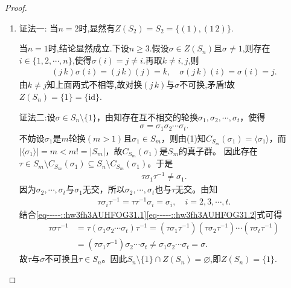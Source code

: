 \documentclass[../../main.tex]{subfiles}%
\begin{document}
\begin{proof}
\begin{enumerate}[(1)]
\begin{align*}
{}.
\end{align*}
从而
\begin{align*}
\tau \left( 1 \right) =i,\tau \left( 2 \right) =i+1,\cdots ,\tau \left( n-i+1 \right) =n,\tau \left( n-i+2 \right) =1,\cdots ,\tau \left( n \right) =i-1.
\end{align*}
于是
\begin{align*}
\tau=\begin{pmatrix}
1 & 2 & \cdots & n-i+1 & n-i+2 & \cdots & n \\
i & i+1 & \cdots & n & 1 & \cdots & i-1
\end{pmatrix},
\end{align*}
即$\tau=\sigma^{i-1}$. 故$C_{S_n}(\sigma)=\langle\sigma\rangle$.

\item {\color{blue}证法一:}
当$n=2$时,显然有$Z(S_2)=S_2=\{(1),(1\,2)\}$.

当$n=1$时,结论显然成立.下设$n\geqslant 3$.假设$\sigma \in Z(S_n)$且$\sigma \neq 1$,则存在$i\in \{1,2,\cdots,n\}$,使得$\sigma(i)=j\neq i$.再取$k\neq i,j$,则
\begin{gather*}
(j\,k)\sigma(i)=(j\,k)(j)=k,
\quad
\sigma(j\,k)(i)=\sigma(i)=j.
\end{gather*}
由$k\neq j$知上面两式不相等,故对换$(j\,k)$与$\sigma$不可换,矛盾!故$Z(S_n)=\{1\}=\{\text{id}\}$.

{\color{blue}证法二:}设$\sigma \in S_n\setminus\{1\}$，由知存在互不相交的轮换$\sigma_1,\sigma_2,\cdots,\sigma_t$，使得
\begin{align*}
\sigma = \sigma_1\sigma_2\cdots\sigma_t.
\end{align*}
不妨设$\sigma_1$是$m$轮换$(m>1)$且$\sigma_1\in S_m$，则由(1)知$C_{S_m}(\sigma_1)=\langle\sigma_1\rangle$，而$|\langle\sigma_1\rangle|=m<m!=|S_m|$，故$C_{S_m}(\sigma_1)$是$S_m$的真子群。
因此存在$\tau \in S_m\setminus C_{S_m}(\sigma_1) \subseteq S_n\setminus C_{S_m}(\sigma_1)$。于是
\begin{align}
\tau \sigma_1 \tau^{-1} \neq \sigma_1. \label{eq-----::hw3fh3AUHFOG31.1}
\end{align}
因为$\sigma_2,\cdots,\sigma_t$与$\sigma_1$无交，所以$\sigma_2,\cdots,\sigma_t$也与$\tau$无交。由知
\begin{align}
\tau \sigma_i \tau^{-1} = \tau \tau^{-1}\sigma_i = \sigma_i,\quad i=2,3,\cdots,t. \label{eq-----::hw3fh3AUHFOG31.2}
\end{align}
结合\eqref{eq-----::hw3fh3AUHFOG31.1}\eqref{eq-----::hw3fh3AUHFOG31.2}式可得
\begin{align*}
\tau \sigma \tau^{-1} &= \tau (\sigma_1\sigma_2\cdots\sigma_t) \tau^{-1} = (\tau \sigma_1 \tau^{-1})(\tau \sigma_2 \tau^{-1})\cdots(\tau \sigma_t \tau^{-1}) \\
&= (\tau \sigma_1 \tau^{-1})\sigma_2\cdots\sigma_t \neq \sigma_1\sigma_2\cdots\sigma_t = \sigma.
\end{align*}
故$\tau$与$\sigma$不可换且$\tau\in S_n$。因此$S_n\setminus \{1\}\cap Z(S_n)=\varnothing$,即$Z(S_n)=\{1\}$.
\end{enumerate}
\end{proof}
\end{document}
